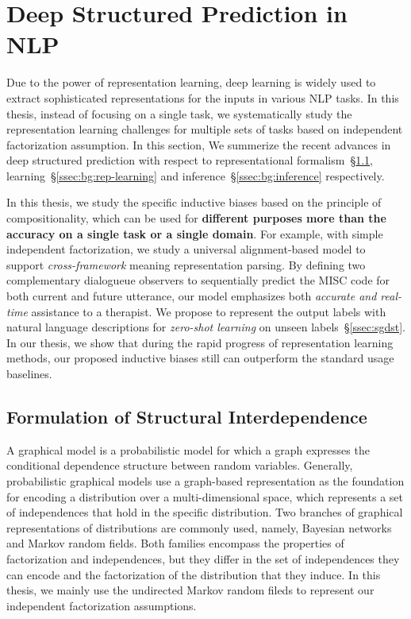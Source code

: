 \section{Deep Structured Prediction in NLP}
\label{sec:background:deepsp}
Due to the power of representation learning, deep learning is widely
used to extract sophisticated representations for the inputs in
various NLP tasks. In this thesis, instead of focusing on a single
task, we systematically study the representation learning challenges
for multiple sets of tasks based on independent factorization
assumption.  In this section, We summerize the recent advances in deep
structured prediction with respect to representational
formalism~\S\ref{ssec:bg:formalism},
learning~\S\ref{ssec:bg:rep-learning} and
inference~\S\ref{ssec:bg:inference} respectively.

In this thesis, we study the specific inductive biases based on the
principle of compositionality, which can be used for \textbf{different
  purposes more than the accuracy on a single task or a single
  domain}. For example, with simple independent factorization, we
study a universal alignment-based model to support
\textit{cross-framework} meaning representation parsing. By defining
two complementary dialogueue observers to sequentially predict the
MISC code for both current and future utterance, our model emphasizes
both \textit{accurate and real-time} assistance to a therapist. We
propose to represent the output labels with natural language
descriptions for \textit{zero-shot learning} on unseen
labels~\S\ref{ssec:sgdst}. In our thesis, we show that during the
rapid progress of representation learning methods, our proposed
inductive biases still can outperform the standard usage baselines.

\subsection{Formulation of Structural Interdependence}
\label{ssec:bg:formalism}

 A graphical model is a probabilistic
model for which a graph expresses the conditional dependence structure
between random variables. Generally, probabilistic graphical models
use a graph-based representation as the foundation for encoding a
distribution over a multi-dimensional space, which represents a set of
independences that hold in the specific distribution. Two branches of
graphical representations of distributions are commonly used, namely,
Bayesian networks and Markov random fields. Both families encompass
the properties of factorization and independences, but they differ in
the set of independences they can encode and the factorization of the
distribution that they induce.  In this thesis, we mainly use the
undirected Markov random fileds to represent our independent
factorization assumptions.

